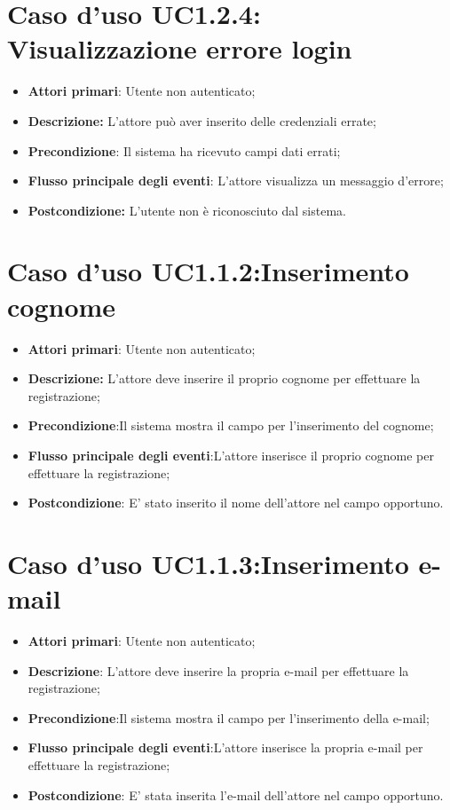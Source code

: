	\section{Caso d'uso UC1.2.4:  Visualizzazione errore login}
		\begin{itemize}
			\item \textbf{Attori primari}: Utente non autenticato;
			\item \textbf{Descrizione:} L'attore può aver inserito delle credenziali errate;
			\item \textbf{Precondizione}: Il sistema ha ricevuto campi dati errati;
			\item \textbf{Flusso principale degli eventi}: L'attore visualizza un messaggio d'errore;
			\item \textbf{Postcondizione:} L'utente non è riconosciuto dal sistema.
		\end{itemize}
		\section{Caso d'uso UC1.1.2:Inserimento cognome}
		\begin{itemize}
			\item \textbf{Attori primari}: Utente non autenticato;
			\item \textbf{Descrizione:} L'attore deve inserire il proprio cognome per effettuare la registrazione;
			\item \textbf{Precondizione}:Il sistema mostra il campo per l'inserimento del cognome;
			\item \textbf{Flusso principale degli eventi}:L'attore inserisce il proprio cognome per effettuare la registrazione;
			\item \textbf{Postcondizione}: E' stato inserito il nome dell'attore nel campo opportuno.
		\end{itemize}
		\section{Caso d'uso UC1.1.3:Inserimento e-mail}
		\begin{itemize}
			\item \textbf{Attori primari}: Utente non autenticato;
			\item \textbf{Descrizione}: L'attore deve inserire la propria e-mail per effettuare la  registrazione;
			\item \textbf{Precondizione}:Il sistema mostra il campo per l'inserimento della e-mail;
			\item \textbf{Flusso principale degli eventi}:L'attore inserisce la propria e-mail per effettuare la registrazione;
			\item \textbf{Postcondizione}: E' stata inserita l'e-mail dell'attore nel campo opportuno.
		\end{itemize}
